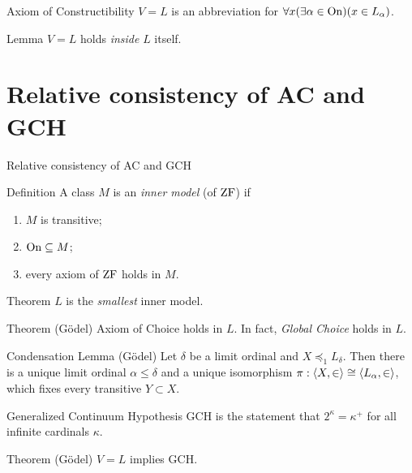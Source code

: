 \begin{frame}
	\begin{block}{Axiom of Constructibility}
		$V{=}L$ is an abbreviation for $\forall x(\exists\alpha\in\operatorname{On})(x\in L_\alpha)$.
	\end{block}
	
	\pause\begin{block}{Lemma}
	$V{=}L$ holds \textit{inside} $L$ itself.
	\end{block}
\end{frame}


\section[$\con(\zf)\Rightarrow\con(\zfc+\gch)$]{Relative consistency of AC and GCH}
\begin{frame}{Relative consistency of AC and GCH}
	\begin{block}{Definition}
		A class $M$ is an \textit{inner model} (of $\operatorname{ZF}$) if
		\begin{enumerate}
			\item $M$ is transitive;
			\item $\operatorname{On}\subseteq M$;
			\item every axiom of $\operatorname{ZF}$ holds in $M$.
		\end{enumerate}
	\end{block}
	
	\pause\begin{block}{Theorem}
		$L$ is the \textit{smallest} inner model.
	\end{block}
\end{frame}

\begin{frame}
	\begin{block}{Theorem (Gödel)}
		Axiom of Choice holds in $L$. In fact, \textit{Global Choice} holds in $L$.
	\end{block}
	
	\pause\begin{block}{Condensation Lemma (Gödel)}
		Let $\delta$ be a limit ordinal and $X\preceq_1 L_\delta$. Then there is a unique limit ordinal $\alpha\leq\delta$ and a unique isomorphism $\pi:\langle X,\in\rangle\cong\langle L_\alpha,\in\rangle$, which fixes every transitive $Y\subset X$.
	\end{block}
	
	\pause\begin{block}{Generalized Continuum Hypothesis}
		GCH is the statement that $2^\kappa=\kappa^+$ for all infinite cardinals $\kappa$.
	\end{block}		
	
	\pause\begin{block}{Theorem (Gödel)}
		$V{=}L$ implies GCH.
	\end{block}
\end{frame}

